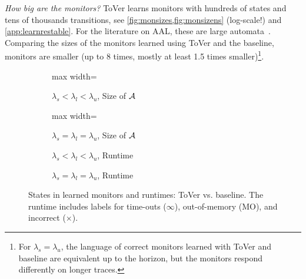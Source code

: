 \documentclass[runningheads]{llncs}
\newcommand{\appcite}[2]{#2} %
\newcommand{\lm}[2][]{\todo[color=cyan!50!white,#1]{\footnotesize{Luko: #2}}}
\renewcommand{\paragraph}[1]{\smallskip\noindent\emph{#1}}
\newcommand{\alg}{ToVer\xspace}
\begin{document}
\paragraph{How big are the monitors?}
\alg{} learns monitors with hundreds of states and tens of thousands transitions, see \cref{fig:monsizes,fig:monsizens} (log-scale!) and \appcite{\cite[App. E.2]{TR}}{\cref{app:learnrestable}}. For the literature on AAL, these are large automata~\cite{yangImprovingModelInference2019,aichernigBenchmarkingCombinationsLearning2024,smeenkApplyingAutomataLearning2015}. Comparing the sizes of the monitors learned using \alg and the baseline, monitors are smaller (up to 8 times, mostly at least 1.5 times smaller)\footnote{For $\lambda_s = \lambda_u$, the language of correct monitors learned with \alg and baseline are equivalent up to the horizon, but the monitors respond differently on longer traces.}.

\begin{figure}[t]
    \begin{subfigure}{.525\linewidth}
        \begin{adjustbox}{max width=\linewidth}
            
        \end{adjustbox}
        \caption{$\lambda_s < \lambda_l < \lambda_u$, Size of $\mathcal{A}$}
        \label{fig:monsizes}
    \end{subfigure}\hfill
    \begin{subfigure}{.455\linewidth}
        \begin{adjustbox}{max width=\linewidth}
            
        \end{adjustbox}
        \caption{$\lambda_s=\lambda_l=\lambda_u$, Size of $\mathcal{A}$}
        \label{fig:monsizens}
    \end{subfigure}\hfill
    \begin{subfigure}{.525\linewidth}
        \resizebox{\linewidth}{!}{
            }
        \caption{$\lambda_s < \lambda_l < \lambda_u$, \mbox{Runtime}}
        \label{fig:runtime-ws-comp}
    \end{subfigure}\hfill
    \begin{subfigure}{.455\linewidth}
        \resizebox{\linewidth}{!}{
            }
        \caption{$\lambda_s=\lambda_l=\lambda_u$, Runtime}
        \label{fig:runtime-ns-comp}
    \end{subfigure}
    \caption{States in learned monitors and runtimes: \alg vs. baseline. The runtime includes labels for time-outs ($\infty$), out-of-memory (MO), and incorrect ($\times$).}
\end{figure}
\end{document}
